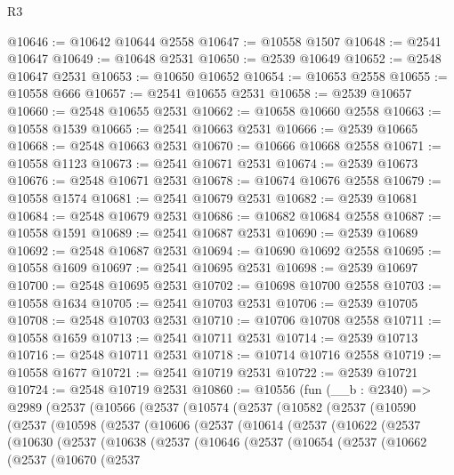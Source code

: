 \begin{lexlean}{R3}
\begin{coremodule}
@10646 := @10642 @10644 @2558
@10647 := @10558 @1507
@10648 := @2541 @10647
@10649 := @10648 @2531
@10650 := @2539 @10649
@10652 := @2548 @10647 @2531
@10653 := @10650 @10652
@10654 := @10653 @2558
@10655 := @10558 @666
@10657 := @2541 @10655 @2531
@10658 := @2539 @10657
@10660 := @2548 @10655 @2531
@10662 := @10658 @10660 @2558
@10663 := @10558 @1539
@10665 := @2541 @10663 @2531
@10666 := @2539 @10665
@10668 := @2548 @10663 @2531
@10670 := @10666 @10668 @2558
@10671 := @10558 @1123
@10673 := @2541 @10671 @2531
@10674 := @2539 @10673
@10676 := @2548 @10671 @2531
@10678 := @10674 @10676 @2558
@10679 := @10558 @1574
@10681 := @2541 @10679 @2531
@10682 := @2539 @10681
@10684 := @2548 @10679 @2531
@10686 := @10682 @10684 @2558
@10687 := @10558 @1591
@10689 := @2541 @10687 @2531
@10690 := @2539 @10689
@10692 := @2548 @10687 @2531
@10694 := @10690 @10692 @2558
@10695 := @10558 @1609
@10697 := @2541 @10695 @2531
@10698 := @2539 @10697
@10700 := @2548 @10695 @2531
@10702 := @10698 @10700 @2558
@10703 := @10558 @1634
@10705 := @2541 @10703 @2531
@10706 := @2539 @10705
@10708 := @2548 @10703 @2531
@10710 := @10706 @10708 @2558
@10711 := @10558 @1659
@10713 := @2541 @10711 @2531
@10714 := @2539 @10713
@10716 := @2548 @10711 @2531
@10718 := @10714 @10716 @2558
@10719 := @10558 @1677
@10721 := @2541 @10719 @2531
@10722 := @2539 @10721
@10724 := @2548 @10719 @2531
@10860 := @10556
    (fun (__b : @2340) =>
    @2989
      (@2537
        (@10566
          (@2537
            (@10574
              (@2537
                (@10582
                  (@2537
                    (@10590
                      (@2537
                        (@10598
                          (@2537
                            (@10606
                              (@2537
                                (@10614
                                  (@2537
                                    (@10622
                                      (@2537
                                        (@10630
                                          (@2537
                                            (@10638
                                              (@2537
                                                (@10646
                                                  (@2537
                                                    (@10654
                                                      (@2537
                                                        (@10662
                                                          (@2537
                                                            (@10670
                                                              (@2537

\end{coremodule}
\end{lexlean}

